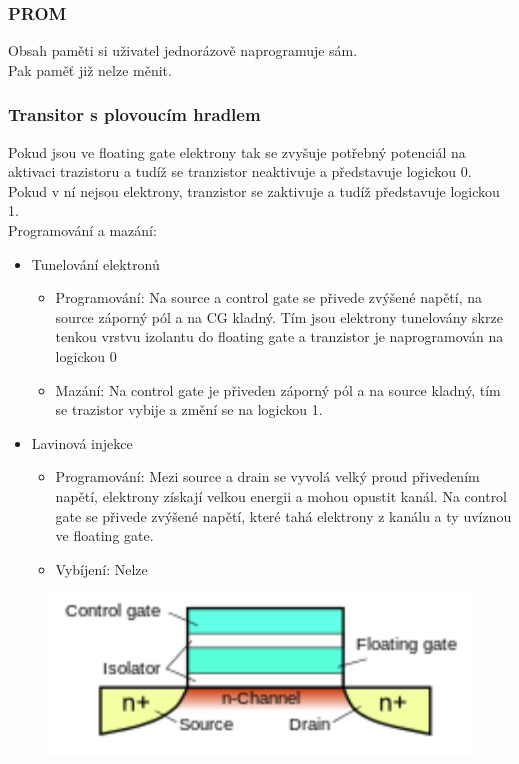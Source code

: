 \subsubsection*{PROM}
Obsah paměti si uživatel jednorázově naprogramuje sám. \\
Pak paměť již nelze měnit. \\

\subsubsection*{Transitor s plovoucím hradlem}
Pokud jsou ve floating gate elektrony tak se zvyšuje potřebný potenciál na aktivaci trazistoru a tudíž se tranzistor neaktivuje a představuje logickou 0. \\
Pokud v ní nejsou elektrony, tranzistor se zaktivuje a tudíž představuje logickou 1. \\
Programování a mazání:
\begin{itemize}
    \item Tunelování elektronů
          \begin{itemize}
              \item Programování: Na source a control gate se přivede zvýšené napětí, na source záporný pól a na CG kladný. Tím jsou elektrony tunelovány skrze tenkou vrstvu izolantu do floating gate a tranzistor je naprogramován na logickou 0
              \item Mazání: Na control gate je přiveden záporný pól a na source kladný, tím se trazistor vybije a změní se na logickou 1.
          \end{itemize}
    \item Lavinová injekce
          \begin{itemize}
              \item Programování: Mezi source a drain se vyvolá velký proud přivedením napětí, elektrony získají velkou energii a mohou opustit kanál. Na control gate se přivede zvýšené napětí, které tahá elektrony z kanálu a ty uvíznou ve floating gate.
              \item Vybíjení: Nelze
          \end{itemize}
\end{itemize}

\begin{figure}[h!]
    \centering
    \includegraphics[]{img/FGMOS.png}
\end{figure}
